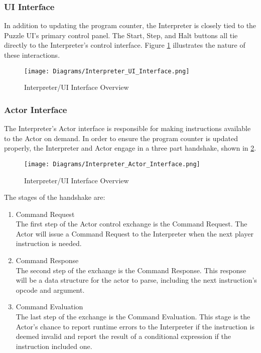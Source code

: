 \subsubsection{UI Interface}
In addition to updating the program counter, the Interpreter is closely tied to the Puzzle UI's primary
control panel. The Start, Step, and Halt buttons all tie directly to the Interpreter's control interface.
Figure \ref{fig:interpreter_UI_interface} illustrates the nature of these interactions.

\begin{figure}[!htb]
	\caption{Interpreter/UI Interface Overview}
	\label{fig:interpreter_UI_interface}
	\centering
	\texttt{[image: Diagrams/Interpreter\_UI\_Interface.png]}
\end{figure}

\subsubsection{Actor Interface}
The Interpreter's Actor interface is responsible for making instructions available to the 
Actor on demand. In order to ensure the program counter is updated properly, the 
Interpreter and Actor engage in a three part handshake, shown in 
\ref{fig:interpreter_Actor_interface}.\\

\begin{figure}[!hb]
    \caption{Interpreter/UI Interface Overview}
    \label{fig:interpreter_Actor_interface}
    \centering
    \texttt{[image: Diagrams/Interpreter\_Actor\_Interface.png]}
\end{figure}

\newpage
The stages of the handshake are:
\begin{enumerate}
	\item Command Request\\
	The first step of the Actor control exchange is the Command Request. The Actor 
	will issue a Command Request to the Interpreter when the next player instruction is needed.
	\item Command Response\\
	The second step of the exchange is the Command Response. This response will be a 
	data structure for the actor to parse, including the next instruction's opcode and argument.
	\item Command Evaluation\\
	The last step of the exchange is the Command Evaluation. This stage is the Actor's chance 
	to report runtime errors to the Interpreter if the instruction is deemed invalid and report 
	the result of a conditional expression if the instruction included one. 
\end{enumerate}

